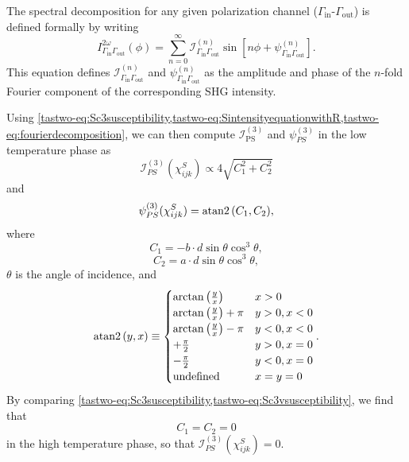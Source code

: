 The spectral decomposition for any given polarization channel ($\Gamma_\mathrm{in}$-$\Gamma_\mathrm{out}$) is defined formally by writing
\begin{equation}
\label{tastwo-eq:fourierdecomposition}
I_{\Gamma_\mathrm{in}\Gamma_\mathrm{out}}^{2\omega}(\phi) = \sum_{n=0}^{\infty} \mathscr{I}_{\Gamma_\mathrm{in}\Gamma_\mathrm{out}}^{(n)} \sin{\left[n\phi + \psi_{\Gamma_\mathrm{in}\Gamma_\mathrm{out}}^{(n)}\right]}.
\end{equation}
This equation defines $\mathscr{I}_{\Gamma_\mathrm{in}\Gamma_\mathrm{out}}^{(n)}$ and $\psi_{\Gamma_\mathrm{in}\Gamma_\mathrm{out}}^{(n)}$ as the amplitude and phase of the $n$-fold Fourier component of the corresponding SHG intensity. 

Using \cref{tastwo-eq:Sc3susceptibility,tastwo-eq:SintensityequationwithR,tastwo-eq:fourierdecomposition}, we can then compute $\mathscr{I}^{(3)}_\mathrm{PS}$ and $\psi_{PS}^{(3)}$ in the low temperature phase as 
\begin{equation}
\label{tastwo-eq:i3PS}
\mathscr{I}_{PS}^{(3)}(\chi^S_{ijk}) \propto 4\sqrt{C_1^2+C_2^2}
\end{equation}
and
\begin{equation}
\psi_{PS}^{(3)}(\chi^S_{ijk}) = \operatorname{atan2}{\left(C_1,C_2\right)},
\end{equation}
where
\begin{equation}
C_1 = -b\cdot d\sin{\theta}\cos^3{\theta},
\end{equation}
\begin{equation}
C_2 = a\cdot d\sin{\theta}\cos^3{\theta},
\end{equation}
$\theta$ is the angle of incidence, and
\begin{equation}
\operatorname{atan2}{(y, x)} \equiv \begin{cases}
\arctan{\left(\frac{y}{x}\right)} & x >  0 \\
\arctan{\left(\frac{y}{x}\right)}+\pi & y>0,x <  0\\ 
\arctan{\left(\frac{y}{x}\right)}-\pi & y<0,x <  0\\ 
+\frac{\pi}{2} & y>0, x=0\\
-\frac{\pi}{2} & y<0, x=0\\
\mathrm{undefined}& x = y = 0 \end{cases}.
\end{equation}
By comparing \cref{tastwo-eq:Sc3susceptibility,tastwo-eq:Sc3vsusceptibility}, we find that
\begin{equation}
C_1 = C_2 = 0
\end{equation}
in the high temperature phase, so that $\mathscr{I}_{PS}^{(3)}(\chi^S_{ijk}) = 0$. 

